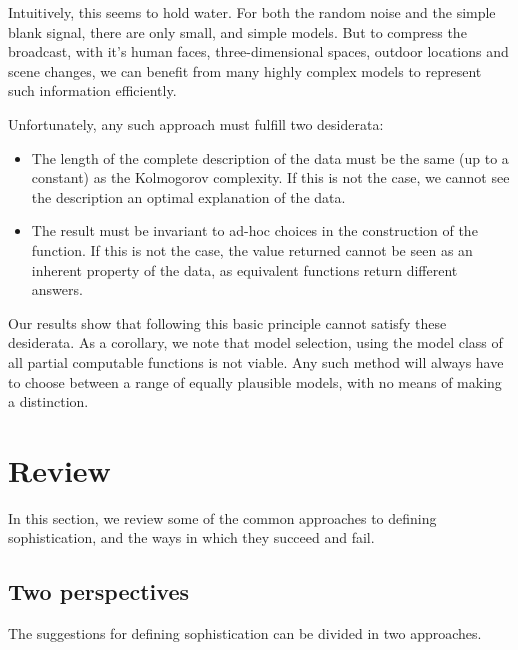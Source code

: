 \documentclass{style/llncs}
\begin{document}

Intuitively, this seems to hold water. For both the random noise and the simple blank signal, there are only small, and simple models. But to compress the broadcast, with it's human faces, three-dimensional spaces, outdoor locations and scene changes, we can benefit from many highly complex models to represent such information efficiently.

Unfortunately, any such approach must fulfill two desiderata:
\begin{itemize}
  \item The length of the complete description of the data must be the same (up to a constant) as the Kolmogorov complexity. If this is not the case, we cannot see the description an optimal explanation of the data.
  \item The result must be invariant to ad-hoc choices in the construction of the function. If this is not the case, the value returned cannot be seen as an inherent property of the data, as equivalent functions return different answers.
\end{itemize}

Our results show that following this basic principle cannot satisfy these desiderata. As a corollary, we note that model selection, using the model class of all partial computable functions is not viable. Any such method will always have to choose between a range of equally plausible models, with no means of making a distinction.

\section{Review}
In this section, we review some of the common approaches to defining sophistication, and 
the ways in which they succeed and fail.

\subsection{Two perspectives}

The suggestions for defining sophistication can be divided in two approaches.
\end{document}
